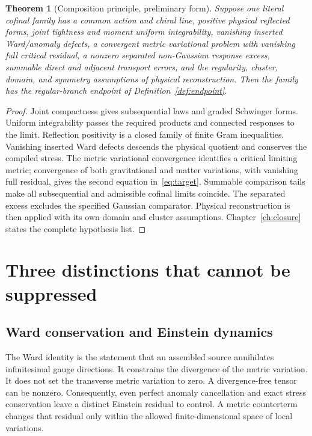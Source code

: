 \documentclass[11pt,a4paper,oneside]{book}
\theoremstyle{plain}
\newtheorem{theorem}{Theorem}[chapter]
\theoremstyle{definition}
\theoremstyle{remark}
\newcommand{\src}[2]{\cite{#1}}
\begin{document}
\begin{theorem}[Composition principle, preliminary form]
\label{thm:composition-preliminary}
Suppose one literal cofinal family has a common action and chiral line, positive physical reflected forms, joint tightness and moment uniform integrability, vanishing inserted Ward/anomaly defects, a convergent metric variational problem with vanishing full critical residual, a nonzero separated non-Gaussian response excess, summable direct and adjacent transport errors, and the regularity, cluster, domain, and symmetry assumptions of physical reconstruction. Then the family has the regular-branch endpoint of Definition~\ref{def:endpoint}.
\end{theorem}
\begin{proof}
Joint compactness gives subsequential laws and graded Schwinger forms. Uniform integrability passes the required products and connected responses to the limit. Reflection positivity is a closed family of finite Gram inequalities. Vanishing inserted Ward defects descends the physical quotient and conserves the compiled stress. The metric variational convergence identifies a critical limiting metric; convergence of both gravitational and matter variations, with vanishing full residual, gives the second equation in~\eqref{eq:target}. Summable comparison tails make all subsequential and admissible cofinal limits coincide. The separated excess excludes the specified Gaussian comparator. Physical reconstruction is then applied with its own domain and cluster assumptions. Chapter~\ref{ch:closure} states the complete hypothesis list.
\end{proof}
\src{R18}{thm:v18v51-conditional-closure}

\section{Three distinctions that cannot be suppressed}
\subsection{Ward conservation and Einstein dynamics}
The Ward identity is the statement that an assembled source annihilates infinitesimal gauge directions. It constrains the divergence of the metric variation. It does not set the transverse metric variation to zero. A divergence-free tensor can be nonzero. Consequently, even perfect anomaly cancellation and exact stress conservation leave a distinct Einstein residual to control. A metric counterterm changes that residual only within the allowed finite-dimensional space of local variations.
\end{document}
